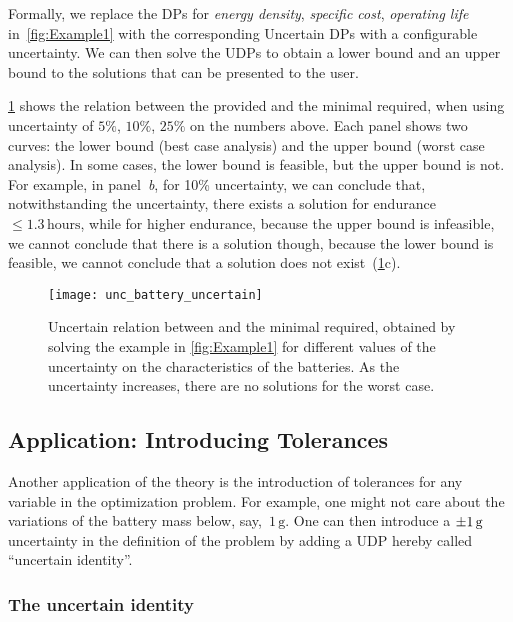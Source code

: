 Formally, we replace the DPs for\emph{ energy density}, \emph{specific
cost}, \emph{operating life} in~\cref{fig:Example1} with the
corresponding Uncertain DPs with a configurable uncertainty. We can
then solve the UDPs to obtain a lower bound and an upper bound to
the solutions that can be presented to the user.

\cref{fig:unc_battery_uncertain} shows the relation between
the provided  and the minimal  required,
when using uncertainty of $5\%$, $10\%$, $25\%$ on the numbers
above. Each panel shows two curves: the lower bound (best case analysis)
and the upper bound (worst case analysis). In some cases, the lower
bound is feasible, but the upper bound is not. For example, in panel~\emph{b},
for 10\% uncertainty, we can conclude that, notwithstanding the uncertainty,
there exists a solution for endurance~$\leq1.3\,\text{hours}$, while
for higher endurance, because the upper bound is infeasible, we cannot
conclude that there is a solution \textemdash{} though, because the
lower bound is feasible, we cannot conclude that a solution does not
exist~(\cref{fig:unc_battery_uncertain}c).

\begin{figure}[h]
  \begin{centering}
    \texttt{[image: unc\_battery\_uncertain]}
  \end{centering}
  \caption{Uncertain relation between 
  and the minimal  required, obtained by solving the
  example in \cref{fig:Example1} for different values of the uncertainty
  on the characteristics of the batteries. As the uncertainty increases,
    there are no solutions for the worst case.}
  \label{fig:unc_battery_uncertain}
\end{figure}

\subsection{Application: Introducing Tolerances\label{sec:Application-tolerance}}

Another application of the theory is the introduction of tolerances
for any variable in the optimization problem. For example, one might
not care about the variations of the battery mass below, say,~$1\,\text{g}$.
One can then introduce a $\pm1\,\text{\ensuremath{\text{g}} }$ uncertainty
in the definition of the problem by adding a UDP hereby called ``uncertain
identity''.

\subsubsection{The uncertain identity}

